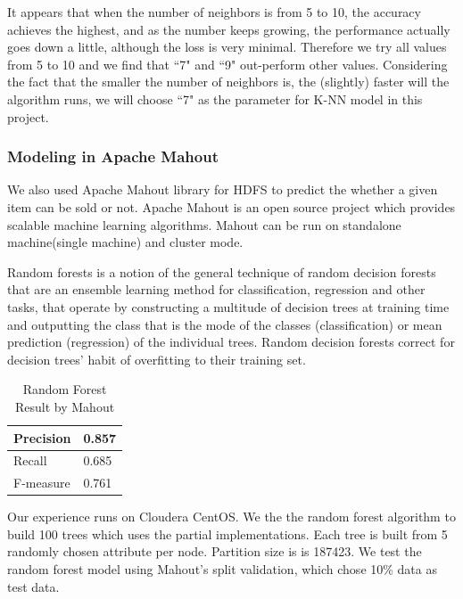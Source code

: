\documentclass[CEJM,PDF]{cej} %
\begin{document}
It appears that when the number of neighbors is from 5 to 10, the accuracy achieves the highest, and as the number keeps growing, the performance actually goes down a little, although the loss is very minimal. Therefore we try all values from 5 to 10 and we find that ``7" and ``9" out-perform other values. Considering the fact that the smaller the number of neighbors is, the (slightly) faster will the algorithm runs, we will choose ``7" as the parameter for K-NN model in this project.\\


\subsubsection{Modeling in Apache Mahout}
We also used Apache Mahout library for HDFS to predict the whether a given item can be sold or not. Apache Mahout is an open source project which provides scalable machine learning algorithms. Mahout can be run on standalone machine(single machine) and cluster mode. 

Random forests is a notion of the general technique of random decision forests that are an ensemble learning method for classification, regression and other tasks, that operate by constructing a multitude of decision trees at training time and outputting the class that is the mode of the classes (classification) or mean prediction (regression) of the individual trees. Random decision forests correct for decision trees' habit of overfitting to their training set\cite{randomforest}.

\begin{table}[h]
\centering
\caption{Random Forest Result by Mahout}
\label{weka-model}
\begin{tabular}{@{}|l|l|@{}}
\toprule
\hline
Precision  & 0.857  \\ \midrule
\hline
Recall & 0.685  \\
\hline
F-measure  & 0.761 \\ \bottomrule
\hline
\end{tabular}
\end{table}

Our experience runs on Cloudera CentOS. We the the random forest algorithm to build 100 trees which uses the partial implementations. Each tree is built from 5 randomly chosen attribute per node. Partition size is is 187423. We test the random forest model using Mahout’s split validation, which chose 10\% data as test data. \\
\end{document}

